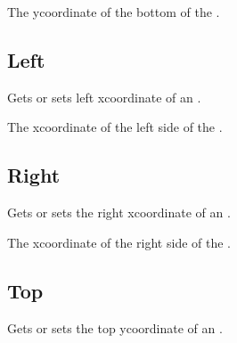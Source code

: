 \documentclass[letterpaper,12pt,english,openany,oneside]{sphinxmanual}
\begin{document}

\begin{sphinxVerbatim}[commandchars=\\\{\}]
\PYG{p}{[}\PYG{p}{]} 
\end{sphinxVerbatim}


The y\sphinxhyphen{}coordinate of the bottom of the .




\subsection{Left}
\label{\detokenize{IAC_API_OLE_Objects:left}}
Gets or sets left x\sphinxhyphen{}coordinate of an .


\begin{sphinxVerbatim}[commandchars=\\\{\}]
\PYG{p}{[}\PYG{p}{]} 
\end{sphinxVerbatim}


The x\sphinxhyphen{}coordinate of the left side of the .




\subsection{Right}
\label{\detokenize{IAC_API_OLE_Objects:right}}
Gets or sets the right x\sphinxhyphen{}coordinate of an .


\begin{sphinxVerbatim}[commandchars=\\\{\}]
\PYG{p}{[}\PYG{p}{]} 
\end{sphinxVerbatim}


The x\sphinxhyphen{}coordinate of the right side of the .




\subsection{Top}
\label{\detokenize{IAC_API_OLE_Objects:top}}
Gets or sets the top y\sphinxhyphen{}coordinate of an .
\end{document}
